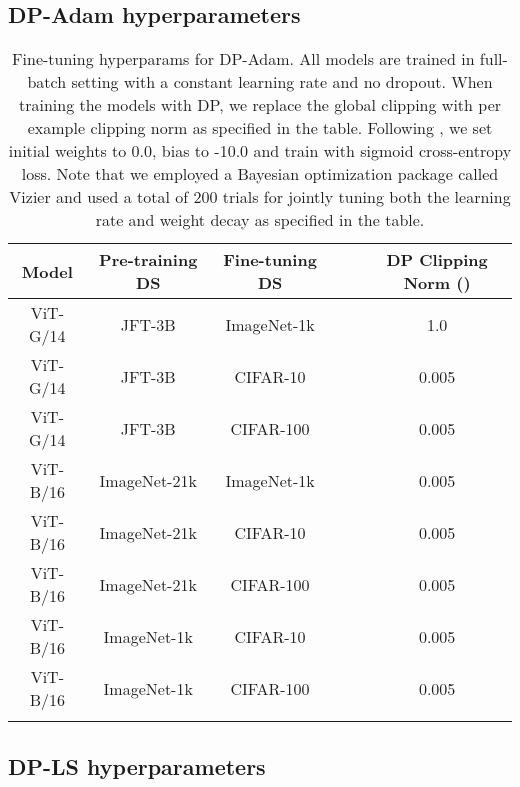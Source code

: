 \documentclass[letterpaper]{article} \usepackage{fullpage}
\begin{document}
\subsection{DP-Adam hyperparameters}

\begin{table}[H]
    \centering
\label{tab:hparams_lamb}
    \begin{tabular}{cccccc}
    \toprule
        Model & Pre-training DS & Fine-tuning DS &  &  & DP Clipping Norm ()  \\
        \midrule
      ViT-G/14 & JFT-3B & ImageNet-1k &  &  & 1.0 \\
           ViT-G/14 & JFT-3B & CIFAR-10 &  &  & 0.005 \\
      ViT-G/14 & JFT-3B & CIFAR-100 &  &  & 0.005 \\
      ViT-B/16 & ImageNet-21k & ImageNet-1k &  &  & 0.005 \\
      ViT-B/16 & ImageNet-21k & CIFAR-10 &  &  & 0.005 \\
      ViT-B/16 & ImageNet-21k & CIFAR-100 &  &  & 0.005 \\
           ViT-B/16 & ImageNet-1k & CIFAR-10 &  &  & 0.005 \\
      ViT-B/16 & ImageNet-1k & CIFAR-100 &  &  & 0.005 \\
         \bottomrule
         \addlinespace[0.3cm]
    \end{tabular}
        \caption{Fine-tuning hyperparams for DP-Adam. All models are trained in full-batch setting with a constant learning rate and no dropout. When training the models with DP, we replace the global clipping with per example clipping norm as specified in the table. Following \cite{mehta2022large}, we set initial weights to 0.0, bias to -10.0 and train with sigmoid cross-entropy loss. Note that we employed a Bayesian optimization package called Vizier \citep{vizier, oss_vizier} and used a total of 200 trials for jointly tuning both the learning rate and weight decay as specified in the table.}
\end{table}

\subsection{DP-LS hyperparameters}
\end{document}
